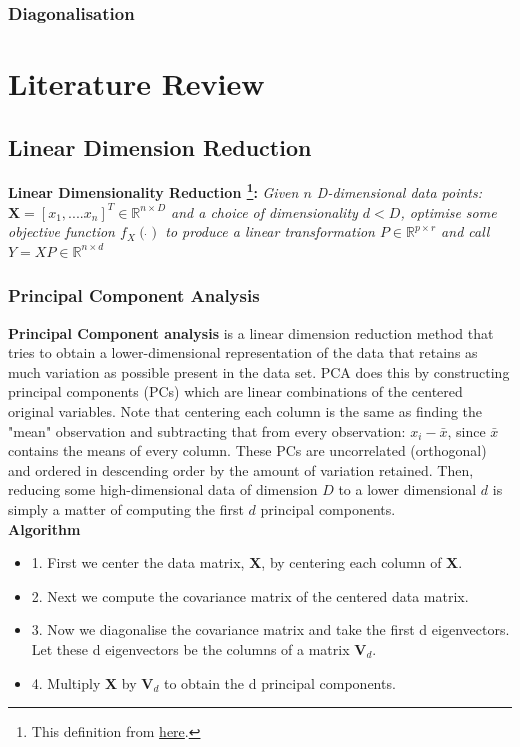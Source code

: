 \documentclass[12pt]{report}
\begin{document}
\subsection{Diagonalisation}




\chapter*{Literature Review}

\section{Linear Dimension Reduction}

\textbf{Linear Dimensionality Reduction
\footnote{This definition from 
\href{https://jmlr.csail.mit.edu/papers/volume16/cunningham15a/cunningham15a.pdf}{here}.}:} 
\textit{Given $n$ D-dimensional data points: $\textbf{X}= [x_1,....x_n]^T \in \mathbb{R}^{n \times D}$ 
and a choice of dimensionality $d < D$, optimise some objective function $f_X(\Dot{})$ 
to produce a linear transformation $P \in \mathbb{R}^{p \times r}$ and call 
$Y = XP \in \mathbb{R}^{n \times d}$}

\subsection{Principal Component Analysis}

\textbf{Principal Component analysis} is a linear dimension reduction method 
that tries to obtain a lower-dimensional representation of the data 
that retains as much variation as possible present in the data set. 
PCA does this by constructing principal components (PCs) 
which are linear combinations of the centered original variables. Note that centering
each column is the same as finding the "mean" 
observation and subtracting that from every observation: $x_i - \bar{x}$, 
since $\bar{x}$ contains the means of every column.
These PCs are uncorrelated (orthogonal) and ordered in descending order 
by the amount of variation retained. 
Then, reducing some high-dimensional data of dimension $D$ to a lower dimensional $d$ 
is simply a matter of computing the first $d$ principal components.\\
\textbf{Algorithm}
\begin{itemize}
    \item 1. First we center the data matrix, \textbf{X}, by centering each column of \textbf{X}.
    \item 2. Next we compute the covariance matrix of the centered data matrix.
    \item 3. Now we diagonalise the covariance matrix and take the first d eigenvectors. 
    Let these d eigenvectors be the columns of a matrix $\textbf{V}_d$.
    \item 4. Multiply \textbf{X} by $\textbf{V}_d$ to obtain the d principal components.
\end{itemize}
\end{document}
